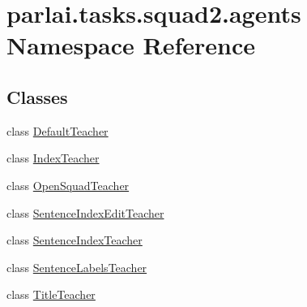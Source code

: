 \hypertarget{namespaceparlai_1_1tasks_1_1squad2_1_1agents}{}\section{parlai.\+tasks.\+squad2.\+agents Namespace Reference}
\label{namespaceparlai_1_1tasks_1_1squad2_1_1agents}
\subsection*{Classes}
\begin{DoxyCompactItemize}
\item 
class \hyperlink{classparlai_1_1tasks_1_1squad2_1_1agents_1_1DefaultTeacher}{Default\+Teacher}
\item 
class \hyperlink{classparlai_1_1tasks_1_1squad2_1_1agents_1_1IndexTeacher}{Index\+Teacher}
\item 
class \hyperlink{classparlai_1_1tasks_1_1squad2_1_1agents_1_1OpenSquadTeacher}{Open\+Squad\+Teacher}
\item 
class \hyperlink{classparlai_1_1tasks_1_1squad2_1_1agents_1_1SentenceIndexEditTeacher}{Sentence\+Index\+Edit\+Teacher}
\item 
class \hyperlink{classparlai_1_1tasks_1_1squad2_1_1agents_1_1SentenceIndexTeacher}{Sentence\+Index\+Teacher}
\item 
class \hyperlink{classparlai_1_1tasks_1_1squad2_1_1agents_1_1SentenceLabelsTeacher}{Sentence\+Labels\+Teacher}
\item 
class \hyperlink{classparlai_1_1tasks_1_1squad2_1_1agents_1_1TitleTeacher}{Title\+Teacher}
\end{DoxyCompactItemize}
